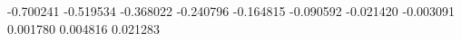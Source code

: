 -0.700241
-0.519534
-0.368022
-0.240796
-0.164815
-0.090592
-0.021420
-0.003091
0.001780
0.004816
0.021283
